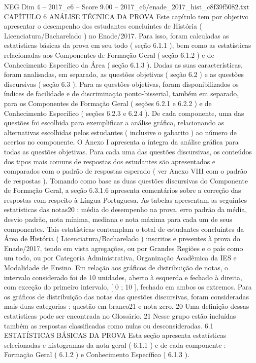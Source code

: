 \begin{textsample}{NEG Dim 4 – 2017\_c6 – Score 9.00 – 2017\_c6/enade\_2017\_hist\_c8f39f5082.txt}  \label{ex:f4_neg_325}
CAPÍTULO 6 ANÁLISE TÉCNICA DA PROVA Este capítulo tem por objetivo apresentar o desempenho dos estudantes concluintes de História ( Licenciatura/Bacharelado ) no Enade/2017.
Para isso, foram calculadas as estatísticas básicas da prova em seu todo ( seção 6.1.1 ), bem como as estatísticas relacionadas aos Componentes de Formação Geral ( seção 6.1.2 ) e de Conhecimento Específico da Área ( seção 6.1.3 ).
Dadas as suas características, foram analisadas, em separado, as questões objetivas ( seção 6.2 ) e as questões discursivas ( seção 6.3 ).
Para as questões objetivas, foram disponibilizados os índices de facilidade e de discriminação ponto-bisserial, também em separado, para os Componentes de Formação Geral ( seções 6.2.1 e 6.2.2 ) e de Conhecimento Específico ( seções 6.2.3 e 6.2.4 ).
De cada componente, uma das questões foi escolhida para exemplificar a análise gráfica, relacionando as alternativas escolhidas pelos estudantes ( inclusive o gabarito ) ao número de acertos no componente.
O Anexo I apresenta a íntegra da análise gráfica para todas as questões objetivas.
Para cada uma das questões discursivas, os conteúdos dos tipos mais comuns de respostas dos estudantes são apresentados e comparados com o padrão de respostas esperado ( ver Anexo VIII com o padrão de respostas ).
Tomando como base as duas questões discursivas do Componente de Formação Geral, a seção 6.3.1.6 apresenta comentários sobre a correção das respostas com respeito à Língua Portuguesa.
As tabelas apresentam as seguintes estatísticas das notas20 : média do desempenho na prova, erro padrão da média, desvio padrão, nota mínima, mediana e nota máxima para cada um de seus componentes.
Tais estatísticas contemplam o total de estudantes concluintes da Área de História ( Licenciatura/Bacharelado ) inscritos e presentes à prova do Enade/2017, tendo em vista agregações, ou por Grandes Regiões e o país como um todo, ou por Categoria Administrativa, Organização Acadêmica da IES e Modalidade de Ensino.
Em relação aos gráficos de distribuição de notas, o intervalo considerado foi de 10 unidades, aberto à esquerda e fechado à direita, com exceção do primeiro intervalo, [ 0 ; 10 ], fechado em ambos os extremos.
Para os gráficos de distribuição das notas das questões discursivas, foram consideradas mais duas categorias : questão em branco21 e nota zero. 20 Uma definição dessas estatísticas pode ser encontrada no Glossário. 21 Nesse grupo estão incluídas também as respostas classificadas como nulas ou desconsideradas. 6.1 ESTATÍSTICAS BÁSICAS DA PROVA Esta seção apresenta estatísticas selecionadas e histogramas da nota geral ( 6.1.1 ) e de cada componente : Formação Geral ( 6.1.2 ) e Conhecimento Específico ( 6.1.3 ).

\end{textsample}
